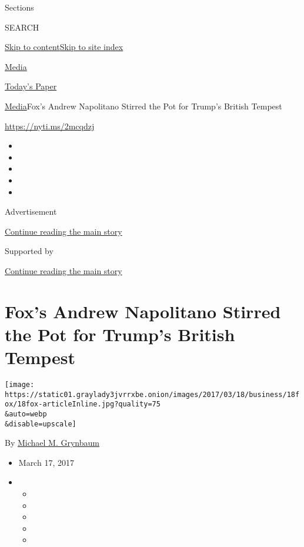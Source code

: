 Sections

SEARCH

\protect\hyperlink{site-content}{Skip to
content}\protect\hyperlink{site-index}{Skip to site index}

\href{https://www.nytimes3xbfgragh.onion/section/business/media}{Media}

\href{https://myaccount.nytimes3xbfgragh.onion/auth/login?response_type=cookie\&client_id=vi}{}

\href{https://www.nytimes3xbfgragh.onion/section/todayspaper}{Today's
Paper}

\href{/section/business/media}{Media}\textbar{}Fox's Andrew Napolitano
Stirred the Pot for Trump's British Tempest

\url{https://nyti.ms/2mcqdzj}

\begin{itemize}
\item
\item
\item
\item
\item
\end{itemize}

Advertisement

\protect\hyperlink{after-top}{Continue reading the main story}

Supported by

\protect\hyperlink{after-sponsor}{Continue reading the main story}

\hypertarget{foxs-andrew-napolitano-stirred-the-pot-for-trumps-british-tempest}{%
\section{Fox's Andrew Napolitano Stirred the Pot for Trump's British
Tempest}\label{foxs-andrew-napolitano-stirred-the-pot-for-trumps-british-tempest}}

\texttt{[image: https://static01.graylady3jvrrxbe.onion/images/2017/03/18/business/18fox/18fox-articleInline.jpg?quality=75\\\&auto=webp\\\&disable=upscale]}

By
\href{http://www.nytimes3xbfgragh.onion/by/michael-m-grynbaum}{Michael
M. Grynbaum}

\begin{itemize}
\item
  March 17, 2017
\item
  \begin{itemize}
  \item
  \item
  \item
  \item
  \item
  \end{itemize}
\end{itemize}

